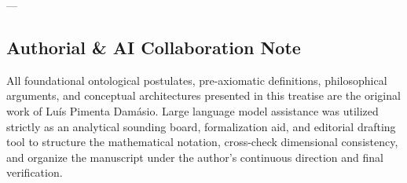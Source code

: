 \documentclass[
]{article}
\begin{document}
---

\subsection*{Authorial \& AI Collaboration Note}

All foundational ontological postulates, pre-axiomatic definitions, philosophical arguments, and conceptual architectures presented in this treatise are the original work of Luís Pimenta Damásio. Large language model assistance was utilized strictly as an analytical sounding board, formalization aid, and editorial drafting tool to structure the mathematical notation, cross-check dimensional consistency, and organize the manuscript under the author's continuous direction and final verification.
\end{document}
